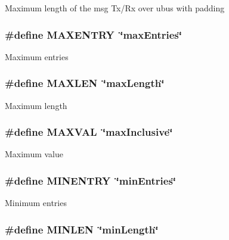 Maximum length of the msg Tx/\-Rx over ubus with padding \hypertarget{group__LIBHELP_ga7dd186f2b30361953627365015ba5120}{
\subsubsection[{M\-A\-X\-E\-N\-T\-R\-Y}]{\setlength{\rightskip}{0pt plus 5cm}\#define M\-A\-X\-E\-N\-T\-R\-Y~\char`\"{}max\-Entries\char`\"{}}}\label{group__LIBHELP_ga7dd186f2b30361953627365015ba5120}
Maximum entries \hypertarget{group__LIBHELP_gae6648cd71a8bd49d58ae8ed33ba910d1}{
\subsubsection[{M\-A\-X\-L\-E\-N}]{\setlength{\rightskip}{0pt plus 5cm}\#define M\-A\-X\-L\-E\-N~\char`\"{}max\-Length\char`\"{}}}\label{group__LIBHELP_gae6648cd71a8bd49d58ae8ed33ba910d1}
Maximum length \hypertarget{group__LIBHELP_gac7129ccaa762fa4c6b07733faa0a16e0}{
\subsubsection[{M\-A\-X\-V\-A\-L}]{\setlength{\rightskip}{0pt plus 5cm}\#define M\-A\-X\-V\-A\-L~\char`\"{}max\-Inclusive\char`\"{}}}\label{group__LIBHELP_gac7129ccaa762fa4c6b07733faa0a16e0}
Maximum value \hypertarget{group__LIBHELP_gac1e659c7aee7cd9099fc5d464169537c}{
\subsubsection[{M\-I\-N\-E\-N\-T\-R\-Y}]{\setlength{\rightskip}{0pt plus 5cm}\#define M\-I\-N\-E\-N\-T\-R\-Y~\char`\"{}min\-Entries\char`\"{}}}\label{group__LIBHELP_gac1e659c7aee7cd9099fc5d464169537c}
Minimum entries \hypertarget{group__LIBHELP_ga0074b0744e9b1a16324c1e3a04b2d234}{
\subsubsection[{M\-I\-N\-L\-E\-N}]{\setlength{\rightskip}{0pt plus 5cm}\#define M\-I\-N\-L\-E\-N~\char`\"{}min\-Length\char`\"{}}}\label{group__LIBHELP_ga0074b0744e9b1a16324c1e3a04b2d234}
